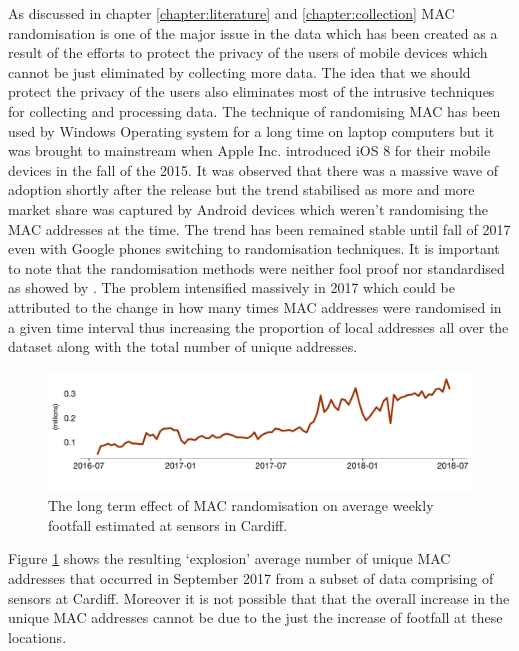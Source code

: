 As discussed in chapter \ref{chapter:literature} and \ref{chapter:collection} MAC randomisation is one of the major issue in the data which has been created as a result of the efforts to protect the privacy of the users of mobile devices which cannot be just eliminated by collecting more data.
The idea that we should protect the privacy of the users also eliminates most of the intrusive techniques for collecting and processing data.
The technique of randomising MAC has been used by Windows Operating system for a long time on laptop computers but it was brought to mainstream when Apple Inc. introduced iOS 8 for their mobile devices in the fall of the 2015.
It was observed that there was a massive wave of adoption shortly after the release but the trend stabilised as more and more market share was captured by Android devices which weren't randomising the MAC addresses at the time.
The trend has been remained stable until fall of 2017 even with Google phones switching to randomisation techniques. 
It is important to note that the randomisation methods were neither fool proof nor standardised as showed by \citep{vanhoef2016}.
The problem intensified massively in 2017 which could be attributed to the change in how many times MAC addresses were randomised in a given time interval thus increasing the proportion of local addresses all over the dataset along with the total number of unique addresses.

\begin{figure}
  \includegraphics[trim={0 0 0 0},clip]{images/processing-error-randomisation.png}
  \caption{The long term effect of MAC randomisation on average weekly footfall estimated at sensors in Cardiff.}
  \label{figure:processing:error:random}
\end{figure}

Figure \ref{figure:processing:error:random} shows the resulting `explosion' average number of unique MAC addresses that occurred in September 2017 from a subset of data comprising of sensors at Cardiff.
Moreover it is not possible that that the overall increase in the unique MAC addresses cannot be due to the just the increase of footfall at these locations.

